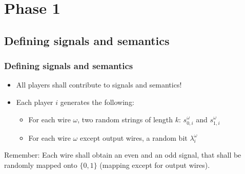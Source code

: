 \documentclass{beamer}
\begin{document}
\section{Phase 1}
\label{sec:computing-the-garbled-circuit}

\subsection{Defining signals and semantics}

\begin{frame}
  \frametitle{Defining signals and semantics}
  \begin{itemize}
  \item All players shall contribute to signals and semantics!
  \item Each player $i$ generates the following:
    \begin{itemize}
    \item For each wire $\omega$, two random strings of length $k$: $s_{0,i}^\omega$ and  $s_{1,i}^\omega$
    \item For each wire $\omega$ except output wires, a random bit $\lambda^\omega_i$
    \end{itemize}
  \end{itemize}
  \begin{alertblock}{Remember:}
      Each wire shall obtain an even and an odd signal, that shall be randomly mapped onto $\{0,1\}$ (mapping except for output wires).
  \end{alertblock}
\end{frame}
\end{document}
